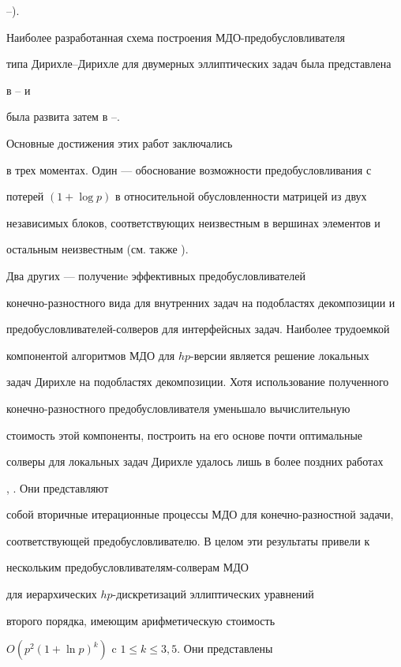 \cite{BabuskaCraigMandelPitkaranta:91}--\cite{guo}).


Наиболее разработанная схема построения МДО-предобусловливателя 


типа Дирихле--Дирихле для двумерных эллиптических задач была представлена


в \cite{KI1995}--\cite{KI1996} и 


была развита затем в \cite{KJ1997}--\cite{KJ1999a}.


Основные достижения этих работ заключались 


в трех моментах. Один --- обоснование возможности предобусловливания с 


потерей $(1+\log p)$ в относительной обусловленности матрицей из двух 


независимых блоков, соответствующих неизвестным в вершинах элементов и 


остальным неизвестным (см. также \cite{BabuskaCraigMandelPitkaranta:91}). 


Два других --- получениe эффективных предобусловливателей


конечно-разностного вида для внутренних задач на подобластях декомпозиции и


предобусловливателей-солверов для интерфейсных задач. Наиболее трудоемкой 


компонентой алгоритмов МДО для $hp$-версии является решение локальных 


задач Дирихле на подобластях декомпозиции. Хотя использование полученного 


конечно-разностного предобусловливателя уменьшало вычислительную


стоимость этой компоненты, построить на его основе почти оптимальные 


солверы для локальных задач Дирихле удалось лишь в более поздних работах 


\cite{K2001}, \cite{K2002}. Они представляют 


собой вторичные итерационные процессы МДО для конечно-разностной задачи,


соответствующей предобусловливателю. В целом эти результаты привели к 


нескольким предобусловливателям-солверам МДО


для иерархических $hp$-дискретизаций эллиптических уравнений


второго порядка, имеющим арифметическую стоимость 


$O(p^2 (1+\ln p)^k)$ c $1\le k \le 3{,}5$. Они представлены


